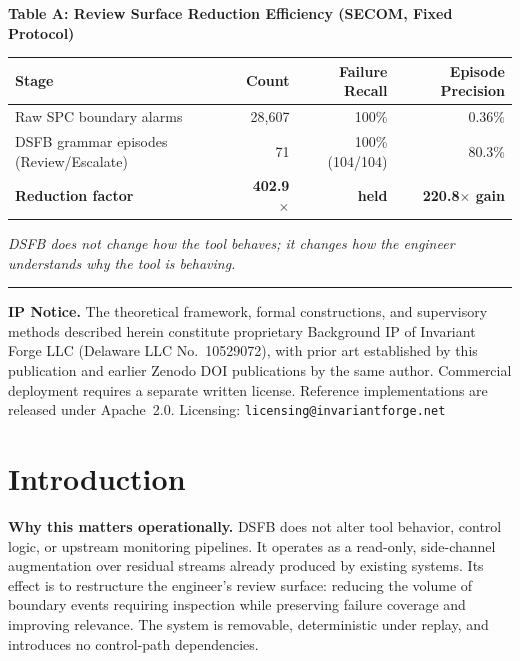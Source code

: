 \documentclass[11pt,letterpaper]{article}
\theoremstyle{scresult}
\begin{document}
\begin{center}
\begin{minipage}{0.88\linewidth}
\vspace{4pt}
\begin{center}
\small
\textbf{Table A: Review Surface Reduction Efficiency (SECOM, Fixed Protocol)}\\[4pt]
\begin{tabular}{lrrr}
\toprule
\textbf{Stage} & \textbf{Count} & \textbf{Failure Recall} & \textbf{Episode Precision}\\
\midrule
Raw SPC boundary alarms & 28{,}607 & 100\% & 0.36\%\\
DSFB grammar episodes (Review/Escalate) & 71 & 100\% (104/104) & 80.3\%\\
\midrule
\textbf{Reduction factor} & \textbf{402.9$\times$} & \textbf{held} & \textbf{220.8$\times$ gain}\\
\bottomrule
\end{tabular}
\end{center}
\vspace{2pt}
\noindent\textit{DSFB does not change how the tool behaves; it changes how the engineer understands why the tool is behaving.}
\end{minipage}

\vspace{8pt}
{\color{SCblue}\rule{\linewidth}{0.8pt}}
\end{center}

\clearpage
\vspace{6pt}
{\footnotesize\color{SCgray}
\textbf{IP Notice.}
The theoretical framework, formal constructions, and supervisory methods described
herein constitute proprietary Background IP of Invariant Forge LLC
(Delaware LLC No.\ 10529072), with prior art established by this publication and
earlier Zenodo DOI publications by the same author. Commercial deployment requires
a separate written license. Reference implementations are released under
Apache~2.0. Licensing: \texttt{licensing@invariantforge.net}
}



\clearpage
\tableofcontents
\clearpage

\section{Introduction}
\label{sec:intro}

\noindent\textbf{Why this matters operationally.}
DSFB does not alter tool behavior, control logic, or upstream monitoring pipelines.
It operates as a read-only, side-channel augmentation over residual streams already
produced by existing systems.
Its effect is to restructure the engineer's review surface: reducing the volume of
boundary events requiring inspection while preserving failure coverage and improving
relevance.
The system is removable, deterministic under replay, and introduces no control-path
dependencies.
\end{document}
